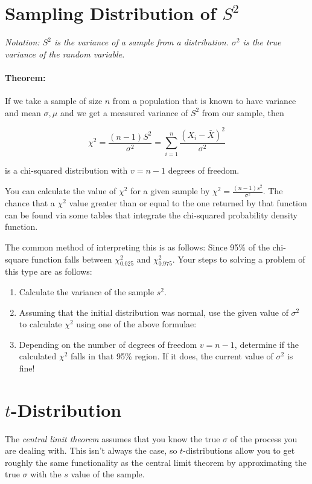 \documentclass[a4paper,12pt]{report}
\begin{document}
\section{Sampling Distribution of $S^2$}

\textit{Notation: $S^2$ is the variance of a sample from a distribution. $\sigma^2$ is the true variance of the random variable.}

\paragraph{Theorem: } If we take a sample of size $n$ from a population that is known to have variance and mean $\sigma, \mu$ and we get a measured variance of $S^2$ from our sample, then

$$\chi^2 = \frac{(n-1)S^2}{\sigma^2} = \sum_{i = 1}^{n} \frac{(X_i - \bar{X})^2}{\sigma^2}$$

is a chi-squared distribution with $v = n-1$ degrees of freedom.

You can calculate the value of $\chi^2$ for a given sample by $\chi^2 = \frac{(n-1)s^2}{\sigma^2}$. The chance that a $\chi^2$ value greater than or equal to the one returned by that function can be found via some tables that integrate the chi-squared probability density function. 

The common method of interpreting this is as follows: Since 95\% of the chi-square function falls between $\chi^2_{0.025}$ and $\chi^2_{0.975}$. Your steps to solving a problem of this type are as follows:

\begin{enumerate}
\item Calculate the variance of the sample $s^2$.
\item Assuming that the initial distribution was normal, use the given value of $\sigma^2$ to calculate $\chi^2$ using one of the above formulae: 
\item Depending on the number of degrees of freedom $v = n-1$, determine if the calculated $\chi^2$ falls in that 95\% region. If it does, the current value of $\sigma^2$ is fine!
\end{enumerate}


\section{$t$-Distribution}

The \textit{central limit theorem} assumes that you know the true $\sigma$ of the process you are dealing with. This isn't always the case, so $t$-distributions allow you to get roughly the same functionality as the central limit theorem by approximating the true $\sigma$ with the $s$ value of the sample.
\end{document}

